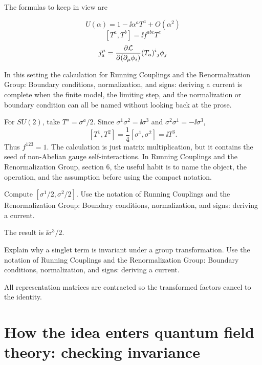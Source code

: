The formulas to keep in view are

\[
  U(\alpha)=1-\ii\alpha^aT^a+O(\alpha^2)
\]
\[
  [T^a,T^b]=\ii f^{abc}T^c
\]
\[
  j^\mu_a=\frac{\partial\mathcal L}{\partial(\partial_\mu\phi_i)}(T_a)^i{}_j\phi_j
\]

In this setting the calculation for Running Couplings and the Renormalization Group: Boundary conditions, normalization, and signs: deriving a current is complete when the finite model, the limiting step, and the normalization or boundary condition can all be named without looking back at the prose.




\begin{example}
For \(SU(2)\), take \(T^a=\sigma^a/2\).  Since \(\sigma^1\sigma^2=\ii\sigma^3\) and \(\sigma^2\sigma^1=-\ii\sigma^3\),
\[
  [T^1,T^2]=\frac14[\sigma^1,\sigma^2]=\ii T^3.
\]
Thus \(f^{123}=1\).  The calculation is just matrix multiplication, but it contains the seed of non-Abelian gauge self-interactions.  In Running Couplings and the Renormalization Group, section 6, the useful habit is to name the object, the operation, and the assumption before using the compact notation.
\end{example}



\begin{exercise}
Compute \([\sigma^1/2,\sigma^2/2]\).  Use the notation of Running Couplings and the Renormalization Group: Boundary conditions, normalization, and signs: deriving a current.
\begin{answer}
The result is \(\ii\sigma^3/2\).
\end{answer}
\end{exercise}

\begin{exercise}
Explain why a singlet term is invariant under a group transformation.  Use the notation of Running Couplings and the Renormalization Group: Boundary conditions, normalization, and signs: deriving a current.
\begin{answer}
All representation matrices are contracted so the transformed factors cancel to the identity.
\end{answer}
\end{exercise}



\section{How the idea enters quantum field theory: checking invariance}

